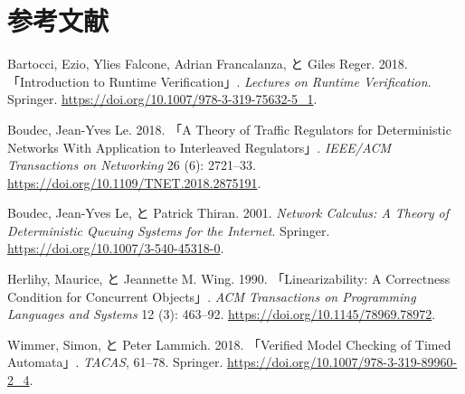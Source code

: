 \documentclass[
  japanese,
]{ltjsarticle}
\newlength{\cslhangindent}
\newenvironment{CSLReferences}[2] %
 {\begin{list}{}{%
  \setlength{\itemindent}{0pt}
  \setlength{\leftmargin}{0pt}
  \setlength{\parsep}{0pt}
  \ifodd #1
   \setlength{\leftmargin}{\cslhangindent}
   \setlength{\itemindent}{-1\cslhangindent}
  \fi
  \setlength{\itemsep}{#2\baselineskip}}}
 {\end{list}}
\begin{document}
\section*{参考文献}\label{ux53c2ux8003ux6587ux732e}

\protect{}\label{refs}
\begin{CSLReferences}{1}{0}
Bartocci, Ezio, Ylies Falcone, Adrian Francalanza, と Giles Reger. 2018.
{「Introduction to Runtime Verification」}. \emph{Lectures on Runtime
Verification}. Springer.
\url{https://doi.org/10.1007/978-3-319-75632-5_1}.

Boudec, Jean-Yves Le. 2018. {「A Theory of Traffic Regulators for
Deterministic Networks With Application to Interleaved Regulators」}.
\emph{IEEE/ACM Transactions on Networking} 26 (6): 2721--33.
\url{https://doi.org/10.1109/TNET.2018.2875191}.

Boudec, Jean-Yves Le, と Patrick Thiran. 2001. \emph{Network Calculus: A
Theory of Deterministic Queuing Systems for the Internet}. Springer.
\url{https://doi.org/10.1007/3-540-45318-0}.

Herlihy, Maurice, と Jeannette M. Wing. 1990. {「Linearizability: A
Correctness Condition for Concurrent Objects」}. \emph{ACM Transactions
on Programming Languages and Systems} 12 (3): 463--92.
\url{https://doi.org/10.1145/78969.78972}.

Wimmer, Simon, と Peter Lammich. 2018. {「Verified Model Checking of
Timed Automata」}. \emph{TACAS}, 61--78. Springer.
\url{https://doi.org/10.1007/978-3-319-89960-2_4}.

\end{CSLReferences}
\end{document}

